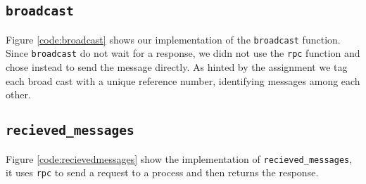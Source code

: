 \subsection{\texttt{broadcast}}

Figure \ref{code:broadcast} shows our implementation of the
\texttt{broadcast} function. Since \texttt{broadcast} do not wait for a
response, we didn not use the \texttt{rpc} function and chose instead to send
the message directly. As hinted by the assignment we tag each broad cast with a
unique reference number, identifying messages among each other.


\subsection{\texttt{recieved\_messages}}

Figure \ref{code:recievedmessages} show the implementation of
\texttt{recieved\_messages}, it uses \texttt{rpc} to send a request to a process
and then returns the response.
